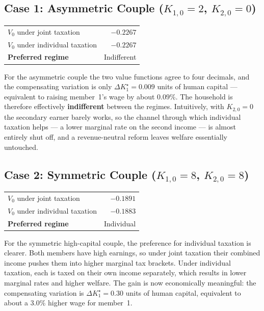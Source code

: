 \subsection*{Case 1: Asymmetric Couple ($K_{1,0} = 2$, $K_{2,0} = 0$)}

\begin{center}
\begin{tabular}{l r}
\hline
$V_0$ under joint taxation      & $-0.2267$ \\
$V_0$ under individual taxation & $-0.2267$ \\
\hline
\textbf{Preferred regime}       & Indifferent \\
\hline
\end{tabular}
\end{center}

For the asymmetric couple the two value functions agree to four decimals, and the compensating variation is only $\Delta K_1^{\star} = 0.009$ units of human capital --- equivalent to raising member~1's wage by about $0.09\%$. The household is therefore effectively \textbf{indifferent} between the regimes. Intuitively, with $K_{2,0}=0$ the secondary earner barely works, so the channel through which individual taxation helps --- a lower marginal rate on the second income --- is almost entirely shut off, and a revenue-neutral reform leaves welfare essentially untouched.

\subsection*{Case 2: Symmetric Couple ($K_{1,0} = 8$, $K_{2,0} = 8$)}

\begin{center}
\begin{tabular}{l r}
\hline
$V_0$ under joint taxation      & $-0.1891$ \\
$V_0$ under individual taxation & $-0.1883$ \\
\hline
\textbf{Preferred regime}       & Individual \\
\hline
\end{tabular}
\end{center}

For the symmetric high-capital couple, the preference for individual taxation is clearer. Both members have high earnings, so under joint taxation their combined income pushes them into higher marginal tax brackets. Under individual taxation, each is taxed on their own income separately, which results in lower marginal rates and higher welfare. The gain is now economically meaningful: the compensating variation is $\Delta K_1^{\star} = 0.30$ units of human capital, equivalent to about a $3.0\%$ higher wage for member~1.

